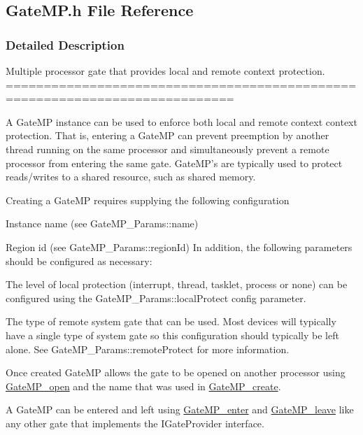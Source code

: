 \subsection{GateMP.h File Reference}
\label{_gate_m_p_8h}


\subsubsection{Detailed Description}
Multiple processor gate that provides local and remote context protection. ============================================================================

A GateMP instance can be used to enforce both local and remote context context protection. That is, entering a GateMP can prevent preemption by another thread running on the same processor and simultaneously prevent a remote processor from entering the same gate. GateMP's are typically used to protect reads/writes to a shared resource, such as shared memory.

Creating a GateMP requires supplying the following configuration
\begin{DoxyItemize}
\item Instance name (see GateMP\_\-Params::name)
\item Region id (see GateMP\_\-Params::regionId) In addition, the following parameters should be configured as necessary:
\item The level of local protection (interrupt, thread, tasklet, process or none) can be configured using the GateMP\_\-Params::localProtect config parameter.
\item The type of remote system gate that can be used. Most devices will typically have a single type of system gate so this configuration should typically be left alone. See GateMP\_\-Params::remoteProtect for more information.
\end{DoxyItemize}

Once created GateMP allows the gate to be opened on another processor using \hyperlink{_gate_m_p_8h_acefd091d723ca21a0a02e1e1d5600fc8}{GateMP\_\-open} and the name that was used in \hyperlink{_gate_m_p_8h_ad83d284487eb5d7996318c7e8d88cf82}{GateMP\_\-create}.

A GateMP can be entered and left using \hyperlink{_gate_m_p_8h_a20a6cab18407f07cb1dbcba48de04cd3}{GateMP\_\-enter} and \hyperlink{_gate_m_p_8h_a622c40958deebda445715cd8e8b3ea34}{GateMP\_\-leave} like any other gate that implements the IGateProvider interface.


